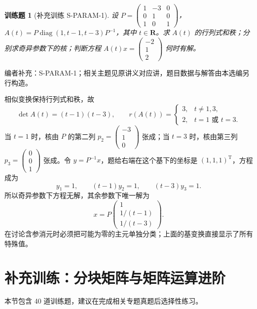 \documentclass[UTF8,12pt,a4paper,fontset=fandol]{ctexart}
\newtheorem{exercise}{训练题}[section]
\begin{document}
\begin{exercise}[补充训练 S-PARAM-1]\label{prob:S-PARAM-1}
设 $P=\begin{pmatrix}1&-3&0\\0&1&0\\1&0&1\end{pmatrix}$，$A(t)=P\operatorname{diag}(1,t-1,t-3)P^{-1}$，其中 $t\in\mathbf R$。求 $A(t)$ 的行列式和秩；分别求奇异参数下的核；判断方程 $A(t)x=\begin{pmatrix}-2\\1\\2\end{pmatrix}$ 何时有解。
\end{exercise}
\noindent 编者补充：S-PARAM-1；相关主题见原讲义对应讲，题目数据与解答由本选编另行构造。
\begin{solve}
相似变换保持行列式和秩，故
\[\det A(t)=(t-1)(t-3),\qquad r(A(t))=\begin{cases}3,&t\ne1,3,\\2,&t=1\text{ 或 }t=3.\end{cases}\]
当 $t=1$ 时，核由 $P$ 的第二列 $p_2=\begin{pmatrix}-3\\1\\0\end{pmatrix}$ 张成；当 $t=3$ 时，核由第三列 $p_3=\begin{pmatrix}0\\0\\1\end{pmatrix}$ 张成。令 $y=P^{-1}x$，题给右端在这个基下的坐标是 $(1,1,1)^{\mathrm T}$，方程成为
\[y_1=1,\qquad(t-1)y_2=1,\qquad(t-3)y_3=1.\]
所以奇异参数下方程无解，其余参数下唯一解为
\[x=P\begin{pmatrix}1\\1/(t-1)\\1/(t-3)\end{pmatrix}.\]
在讨论含参消元时必须把可能为零的主元单独分类；上面的基变换直接显示了所有特殊值。
\end{solve}

\section{补充训练：分块矩阵与矩阵运算进阶}

本节包含 40 道训练题，建议在完成相关专题真题后选择性练习。
\end{document}
